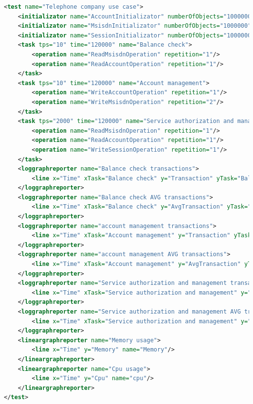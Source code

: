 \begin{lstlisting}[language=xml,caption={Real time prepaid system XML},label={real-time-prepaid-system-xml}]
<test name="Telephone company use case">
	<initializator name="AccountInitializator" numberOfObjects="1000000"/>
	<initializator name="MsisdnInitializator" numberOfObjects="1000000"/>
	<initializator name="SessionInitializator" numberOfObjects="1000000"/>
	<task tps="10" time="120000" name="Balance check">
		<operation name="ReadMsisdnOperation" repetition="1"/>
		<operation name="ReadAccountOperation" repetition="1"/>						
	</task>	
	<task tps="10" time="120000" name="Account management"> 
		<operation name="WriteAccountOperation" repetition="1"/>
		<operation name="WriteMsisdnOperation" repetition="2"/>				
	</task>				
	<task tps="2000" time="120000" name="Service authorization and management">
		<operation name="ReadMsisdnOperation" repetition="1"/>
		<operation name="ReadAccountOperation" repetition="1"/>					
		<operation name="WriteSessionOperation" repetition="1"/>				
	</task>	
	<loggraphreporter name="Balance check transactions">
		<line x="Time" xTask="Balance check" y="Transaction" yTask="Balance check" name="Transactions"/>
	</loggraphreporter>
	<loggraphreporter name="Balance check AVG transactions">
		<line x="Time" xTask="Balance check" y="AvgTransaction" yTask="Balance check" name="AVG"/>						
	</loggraphreporter>
	<loggraphreporter name="account management transactions">
		<line x="Time" xTask="Account management" y="Transaction" yTask="Account management" name="Transactions"/>
	</loggraphreporter>
	<loggraphreporter name="account management AVG transactions">
		<line x="Time" xTask="Account management" y="AvgTransaction" yTask="Account management" name="AVG"/>					
	</loggraphreporter>
	<loggraphreporter name="Service authorization and management transactions">
		<line x="Time" xTask="Service authorization and management" y="Transaction" yTask="Service authorization and management" name="Transactions"/>				
	</loggraphreporter>
	<loggraphreporter name="Service authorization and management AVG transactions">
		<line x="Time" xTask="Service authorization and management" y="AvgTransaction" yTask="Service authorization and management" name="AVG"/>
	</loggraphreporter>
	<lineargraphreporter name="Memory usage">
		<line x="Time" y="Memory" name="Memory"/>		
	</lineargraphreporter>
	<lineargraphreporter name="Cpu usage">
		<line x="Time" y="Cpu" name="cpu"/>
	</lineargraphreporter>		
</test>
\end{lstlisting}

